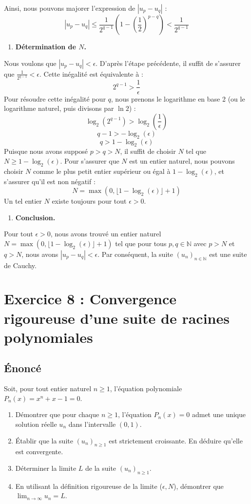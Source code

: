 \documentclass[a4paper,11pt]{report}
\begin{document}
    Ainsi, nous pouvons majorer l'expression de $|u_p - u_q|$ :
    $$ |u_p - u_q| \le \frac{1}{2^{q-1}} \left( 1 - \left(\frac{1}{2}\right)^{p-q} \right) < \frac{1}{2^{q-1}} $$
\begin{enumerate}
\item \textbf{Détermination de $N$.}
\end{enumerate}
    Nous voulons que $|u_p - u_q| < \epsilon$. D'après l'étape précédente, il suffit de s'assurer que $\frac{1}{2^{q-1}} < \epsilon$.
    Cette inégalité est équivalente à :
    $$ 2^{q-1} > \frac{1}{\epsilon} $$
    Pour résoudre cette inégalité pour $q$, nous prenons le logarithme en base 2 (ou le logarithme naturel, puis divisons par $\ln 2$) :
    $$ \log_2(2^{q-1}) > \log_2\left(\frac{1}{\epsilon}\right) $$
    $$ q-1 > -\log_2(\epsilon) $$
    $$ q > 1 - \log_2(\epsilon) $$
    Puisque nous avons supposé $p > q > N$, il suffit de choisir $N$ tel que $N \ge 1 - \log_2(\epsilon)$.
    Pour s'assurer que $N$ est un entier naturel, nous pouvons choisir $N$ comme le plus petit entier supérieur ou égal à $1 - \log_2(\epsilon)$, et s'assurer qu'il est non négatif :
    $$ N = \max\left(0, \lfloor 1 - \log_2(\epsilon) \rfloor + 1\right) $$
    Un tel entier $N$ existe toujours pour tout $\epsilon > 0$.
\begin{enumerate}
\item \textbf{Conclusion.}
\end{enumerate}
    Pour tout $\epsilon > 0$, nous avons trouvé un entier naturel $N = \max\left(0, \lfloor 1 - \log_2(\epsilon) \rfloor + 1\right)$ tel que pour tous $p, q \in \mathbb{N}$ avec $p > N$ et $q > N$, nous avons $|u_p - u_q| < \epsilon$.
    Par conséquent, la suite $(u_n)_{n \in \mathbb{N}}$ est une suite de Cauchy.

\vspace{1cm}

\section*{Exercice 8 : Convergence rigoureuse d'une suite de racines polynomiales}

\subsection*{Énoncé}

Soit, pour tout entier naturel $n \ge 1$, l'équation polynomiale $P_n(x) = x^n + x - 1 = 0$.
\begin{enumerate}
\item Démontrer que pour chaque $n \ge 1$, l'équation $P_n(x) = 0$ admet une unique solution réelle $u_n$ dans l'intervalle $(0, 1)$.

\item Établir que la suite $(u_n)_{n \ge 1}$ est strictement croissante. En déduire qu'elle est convergente.

\item Déterminer la limite $L$ de la suite $(u_n)_{n \ge 1}$.

\item En utilisant la définition rigoureuse de la limite ($\epsilon, N$), démontrer que $\lim_{n \to \infty} u_n = L$.
\end{enumerate}
\end{document}
